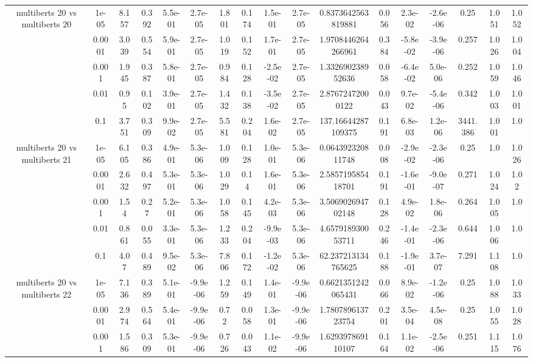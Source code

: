 \begin{tabular}{|c|c|c|c|c|c|c|c|c|c|c|c|c|c|c|c|c|}
\hline
\multirow{5}{*}{multiberts 20 vs multiberts 20} & 1e-05 & 8.157 & 0.392 & 5.5e-01 & 2.7e-05 & 1.801 & 0.174 & 1.5e-01 & 2.7e-05 & 0.8373642563819881 & 0.056 & 2.3e-02 & -2.6e-06 & 0.25 & 1.051 & 1.052 \\
 & 0.0001 & 3.039 & 0.554 & 5.9e-01 & 2.7e-05 & 1.019 & 0.152 & 1.7e-01 & 2.7e-05 & 1.9708446264266961 & 0.384 & -5.8e-02 & -3.9e-06 & 0.257 & 1.026 & 1.004 \\
 & 0.001 & 1.945 & 0.387 & 5.8e-01 & 2.7e-05 & 0.984 & 0.128 & -2.5e-02 & 2.7e-05 & 1.332690238952636 & 0.058 & -6.4e-02 & 5.0e-06 & 0.252 & 1.059 & 1.046 \\
 & 0.01 & 0.95 & 0.102 & 3.9e-01 & 2.7e-05 & 1.432 & 0.138 & -3.5e-02 & 2.7e-05 & 2.87672472000122 & 0.043 & 9.7e-02 & -5.4e-06 & 0.342 & 1.003 & 1.001 \\
 & 0.1 & 3.751 & 0.309 & 9.9e-02 & 2.7e-05 & 5.581 & 0.204 & 1.6e-02 & 2.7e-05 & 137.16644287109375 & 0.191 & 6.8e-03 & 1.2e-06 & 3441.386 & 1.001 & 1.0 \\
\hline
\multirow{5}{*}{multiberts 20 vs multiberts 21} & 1e-05 & 6.105 & 0.386 & 4.9e-01 & 5.3e-06 & 1.009 & 0.128 & 1.0e-01 & 5.3e-06 & 0.064392320811748 & 0.008 & -2.9e-02 & -2.3e-06 & 0.25 & 1.0 & 1.026 \\
 & 0.0001 & 2.632 & 0.497 & 5.3e-01 & 5.3e-06 & 1.029 & 0.14 & 1.6e-01 & 5.3e-06 & 2.585719585418701 & 0.191 & -1.6e-01 & -9.0e-07 & 0.271 & 1.024 & 1.02 \\
 & 0.001 & 1.54 & 0.27 & 5.2e-01 & 5.3e-06 & 1.058 & 0.145 & 4.2e-03 & 5.3e-06 & 3.506902694702148 & 0.128 & 4.9e-02 & 1.8e-06 & 0.264 & 1.005 & 1.0 \\
 & 0.01 & 0.861 & 0.055 & 3.3e-01 & 5.3e-06 & 1.233 & 0.204 & -9.9e-03 & 5.3e-06 & 4.657918930053711 & 0.246 & -1.4e-01 & -2.3e-06 & 0.644 & 1.006 & 1.0 \\
 & 0.1 & 4.07 & 0.489 & 9.5e-02 & 5.3e-06 & 7.806 & 0.172 & -1.2e-02 & 5.3e-06 & 62.237213134765625 & 0.188 & -1.9e-01 & 3.7e-07 & 7.291 & 1.108 & 1.0 \\
\hline
\multirow{5}{*}{multiberts 20 vs multiberts 22} & 1e-05 & 7.136 & 0.389 & 5.1e-01 & -9.9e-06 & 1.259 & 0.149 & 1.4e-01 & -9.9e-06 & 0.6621351242065431 & 0.066 & 8.9e-02 & -1.2e-06 & 0.25 & 1.088 & 1.033 \\
 & 0.0001 & 2.974 & 0.564 & 5.4e-01 & -9.9e-06 & 0.72 & 0.058 & 1.3e-01 & -9.9e-06 & 1.780789613723754 & 0.201 & 3.5e-04 & 4.5e-08 & 0.25 & 1.055 & 1.028 \\
 & 0.001 & 1.586 & 0.309 & 5.3e-01 & -9.9e-06 & 0.726 & 0.043 & 1.1e-02 & -9.9e-06 & 1.629397869110107 & 0.164 & 1.1e-02 & -2.5e-06 & 0.251 & 1.115 & 1.076 \\

\end{tabular}
